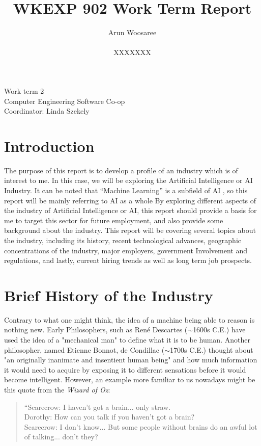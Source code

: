 \documentclass[letterpaper,12pt]{article}
\title{WKEXP 902 Work Term Report}
\author{Arun Woosaree \\ \\ XXXXXXX}
\begin{document}
\relax
\begin{titlepage}
 \maketitle
 \thispagestyle{empty} %
 \centering
 \large
 \vspace{1cm}
 Work term 2\\
 \vspace{1cm}
 Computer Engineering Software Co-op \\
 \vspace{1cm}
 Coordinator: Linda Szekely
\end{titlepage}

\section{Introduction}
The purpose of this report is to develop a profile of an industry which is of interest to me.
In this case, we will be exploring the Artificial Intelligence or AI Industry.
It can be noted that ``Machine Learning'' is a subfield of AI \cite{sasAIvsML},
so this report will be mainly referring to AI as a whole
By exploring different aspects of the industry of Artificial Intelligence or AI, this report should
provide a basis for me to target this sector for future employment, and
also provide some background about the industry.
This report will be covering several topics about the industry,
including its history, recent technological advances, geographic
concentrations of the industry, major employers, government Involvement
and regulations, and lastly, current hiring trends as well as
long term job prospects.


\section{Brief History of the Industry}
Contrary to what one might think, the idea of a machine being able to reason is nothing new. 
Early Philosophers, such as René Descartes ($\sim$1600s C.E.) have used the idea of a "mechanical man"
to define what it is to be human.\cite{briefhistory}\cite{sep-descartes}
Another philosopher, named Etienne Bonnot, de Condillac\cite{briefhistory} ($\sim$1700s C.E.)
thought about "an originally inanimate and insentient human being"\cite{sep-condillac}
and how much information it would need to acquire by exposing it to different sensations
before it would become intelligent. However, an example more familiar to us nowadays
might be this quote from the \textit{Wizard of Oz}\cite{wizardofoz}:
\begin{quotation}
    \noindent“Scarecrow: I haven't got a brain... only straw.\\
    Dorothy: How can you talk if you haven't got a brain?\\
    Scarecrow: I don't know... But some people without brains do an awful lot of talking... don't they?\\
\end{quotation}
\end{document}
